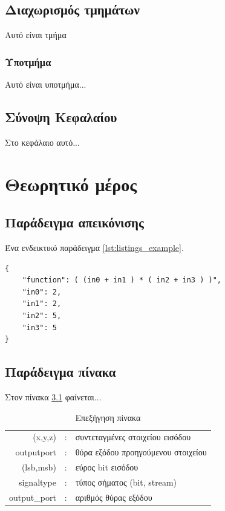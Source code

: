 \documentclass[12pt,a4paper]{report}%
\begin{document}
\section{Διαχωρισμός τμημάτων}
Αυτό είναι τμήμα

\subsection{Υποτμήμα}
Αυτό είναι υποτμήμα...

\section{Σύνοψη Κεφαλαίου}
Στο κεφάλαιο αυτό...

\chapter{Θεωρητικό μέρος}

\section{Παράδειγμα απεικόνισης}
Ένα ενδεικτικό παράδειγμα \ref{lst:listings_example}.

\begin{lstlisting}[label=lst:listings_example,caption=Παράδειγμα απεικόνισης]
{
	"function": ( (in0 + in1 ) * ( in2 + in3 ) )",
	"in0": 2,
	"in1": 2,
	"in2": 5,
	"in3": 5	
}
\end{lstlisting}


\section{Παράδειγμα πίνακα}
Στον πίνακα \ref{tbl:table_example} φαίνεται...

\begin{table}[h]
\centering
\caption{Επεξήγηση πίνακα}
\label{tbl:table_example}
\begin{tabular}{rcl}
(x,y,z)      & : & συντεταγμένες στοιχείου εισόδου    \\
outputport   & : & θύρα εξόδου προηγούμενου στοιχείου \\
(lsb,msb)    & : & εύρος bit εισόδου                  \\
signaltype   & : & τύπος σήματος (bit, stream)        \\
output\_port & : & αριθμός θύρας εξόδου              
\end{tabular}
\end{table}
\end{document}
